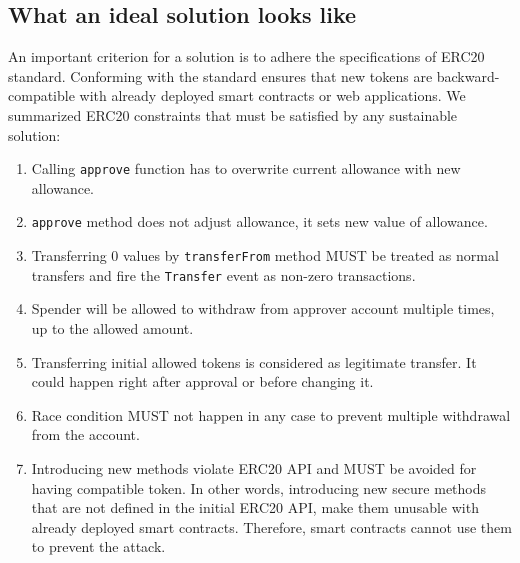 \subsection{What an ideal solution looks like}
An important criterion for a solution is to adhere the specifications of ERC20 standard. Conforming with the standard ensures that new tokens are backward-compatible with already deployed smart contracts or web applications. We summarized ERC20 constraints \cite{Ref08} that must be satisfied by any sustainable solution:


\begin{enumerate}
	\item Calling \texttt{approve} function has to overwrite current allowance with new allowance.
	\item \texttt{approve} method does not adjust allowance, it sets new value of allowance.
	\item Transferring 0 values by \texttt{transferFrom} method MUST be treated as normal transfers and fire the \texttt{Transfer} event as non-zero transactions.
	\item Spender will be allowed to withdraw from approver account multiple times, up to the allowed amount.
	\item Transferring initial allowed tokens is considered as legitimate transfer. It could happen right after approval or before changing it.
	\item Race condition MUST not happen in any case to prevent multiple withdrawal from the account.
	\item Introducing new methods violate ERC20 API and MUST be avoided for having compatible token. In other words, introducing new secure methods that are not defined in the initial ERC20 API, make them unusable with already deployed smart contracts. Therefore, smart contracts cannot use them to prevent the attack.
\end{enumerate}
